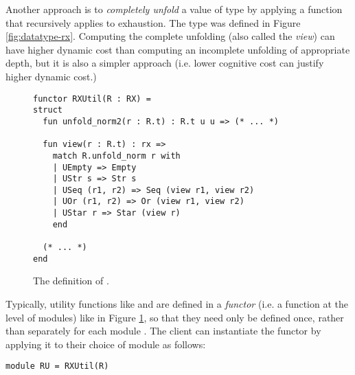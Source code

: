 Another approach is to \emph{completely unfold} a value of type  by applying a function  that recursively applies  to exhaustion. The type  was defined in Figure \ref{fig:datatype-rx}.  Computing the complete unfolding (also called the \emph{view}) can have higher dynamic cost than computing an incomplete unfolding of appropriate depth, but it is also a simpler approach (i.e.   lower cognitive cost can justify higher dynamic cost.)


\begin{figure}
\begin{lstlisting}[numbers=none]
functor RXUtil(R : RX) = 
struct
  fun unfold_norm2(r : R.t) : R.t u u => (* ... *)

  fun view(r : R.t) : rx => 
    match R.unfold_norm r with 
    | UEmpty => Empty
    | UStr s => Str s
    | USeq (r1, r2) => Seq (view r1, view r2)
    | UOr (r1, r2) => Or (view r1, view r2)
    | UStar r => Star (view r)
    end 

  (* ... *)
end
\end{lstlisting}
\vspace{-5px}
\caption{The definition of .}
\vspace{-5px}
\label{fig:RXUtil}
\end{figure}
Typically, utility functions like  and  are defined in a \emph{functor} (i.e. a function at the level of modules) like  in Figure \ref{fig:RXUtil}, so that they need only be defined once, rather than separately for each module . The client can instantiate the functor by applying it to their choice of module as follows:
\begin{lstlisting}[numbers=none]
module RU = RXUtil(R)
\end{lstlisting}
